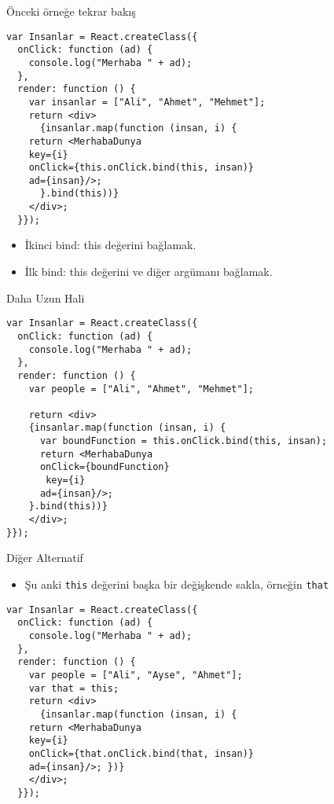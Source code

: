 \documentclass[presentation]{beamer}
\begin{document}
\begin{frame}[fragile,label={sec:org9ce2937}]{Önceki örneğe tekrar bakış}
 \begin{verbatim}
var Insanlar = React.createClass({
  onClick: function (ad) {
    console.log("Merhaba " + ad);
  },
  render: function () {
    var insanlar = ["Ali", "Ahmet", "Mehmet"];
    return <div>
      {insanlar.map(function (insan, i) {
	return <MerhabaDunya
	key={i}
	onClick={this.onClick.bind(this, insan)}
	ad={insan}/>;
      }.bind(this))}
    </div>;
  }});
\end{verbatim}

\begin{itemize}
\item İkinci bind: this değerini bağlamak.
\item İlk bind: this değerini ve diğer argümanı bağlamak.
\end{itemize}
\end{frame}

\begin{frame}[fragile,label={sec:orgaeb4335}]{Daha Uzun Hali}
 \begin{verbatim}
var Insanlar = React.createClass({
  onClick: function (ad) {
    console.log("Merhaba " + ad);
  },
  render: function () {
    var people = ["Ali", "Ahmet", "Mehmet"];

    return <div>
    {insanlar.map(function (insan, i) {
      var boundFunction = this.onClick.bind(this, insan);
      return <MerhabaDunya
      onClick={boundFunction}
       key={i}
      ad={insan}/>;
    }.bind(this))}
    </div>;
}});
\end{verbatim}
\end{frame}

\begin{frame}[fragile,label={sec:org2bd5a69}]{Diğer Alternatif}
 \begin{itemize}
\item Şu anki \texttt{this} değerini başka bir değişkende sakla, örneğin \texttt{that}
\end{itemize}

\begin{verbatim}
var Insanlar = React.createClass({
  onClick: function (ad) {
    console.log("Merhaba " + ad);
  },
  render: function () {
    var people = ["Ali", "Ayse", "Ahmet"];
    var that = this;
    return <div>
      {insanlar.map(function (insan, i) {
	return <MerhabaDunya
	key={i}
	onClick={that.onClick.bind(that, insan)}
	ad={insan}/>; })}
    </div>;
  }});
\end{verbatim}
\end{frame}
\end{document}
